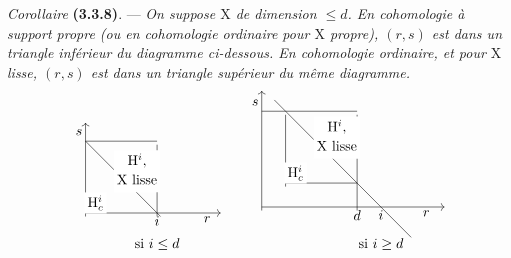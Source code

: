 \documentclass[11pt,leqno]{article}
\begin{document}
\textit{Corollaire} \textbf{(3.3.8)}. — \textit{On suppose \(\mathrm{X}\) de dimension \(\leq d\). En cohomologie à support propre (ou en cohomologie ordinaire pour \(\mathrm{X}\) propre), \((r,s)\) est dans un triangle inférieur du diagramme ci-dessous. En cohomologie ordinaire, et pour \(\mathrm{X}\) lisse, \((r,s)\) est dans un triangle supérieur du même diagramme.}
\[
\begin{tikzcd}[
  ampersand replacement=\&,
  baseline=(current bounding box.south),
  row sep=0pt,
  column sep=0pt,
  cells={nodes={inner sep=0pt,outer sep=0pt,minimum size=0pt,text height=0pt,text depth=0pt}},
  arrows={shorten <=0pt,shorten >=0pt}
]
{} \&[1.8cm] {} \&[1.6cm] {}
\\[0.55cm]
{} \arrow[r,no head] \arrow[dr,no head]
\& {} \arrow[d,no head]
\& {}
\\[1.8cm]
{} \arrow[uu,"\textstyle s"{pos=.9,left}]
   \arrow[rr,"\textstyle r"{pos=.9,below}]
   \arrow[r,phantom,"\textstyle i"{pos=1,below}]
   \arrow[r,phantom,"\textstyle\text{si }i\leq d"{pos=1,below,yshift=-.55cm}]
   \arrow[ur,phantom,"\textstyle\mathrm{H}_c^i"{description,pos=.18}]
   \arrow[ur,phantom,"{\begin{gathered}\textstyle\mathrm{H}^i,\\[-.3ex]\textstyle\mathrm{X}\ \text{lisse}\end{gathered}}"{description,pos=.6,xshift=.25cm}]
\& {}
\& {}
\end{tikzcd}
\qquad
\begin{tikzcd}[
  ampersand replacement=\&,
  baseline=(current bounding box.south),
  row sep=0pt,
  column sep=0pt,
  cells={nodes={inner sep=0pt,outer sep=0pt,minimum size=0pt,text height=0pt,text depth=0pt}},
  arrows={shorten <=0pt,shorten >=0pt}
]
{} \&[.6cm] {} \&[1.8cm] {} \&[.6cm] {} \&[1.6cm] {}
\\[.6cm]
{} \arrow[r,no head]
\& {} \arrow[r,no head]
      \arrow[dr,no head,shorten <=-4mm,shorten >=-18mm]
\& {} \arrow[d,no head]
\& {}
\& {}
\\[1.8cm]
{}
\& {} \arrow[u,no head] \arrow[r,no head]
      \arrow[ur,phantom,"\textstyle\mathrm{H}_c^i"{description,pos=.18}]
      \arrow[ur,phantom,"{\begin{gathered}\textstyle\mathrm{H}^i,\\[-.3ex]\textstyle\mathrm{X}\ \text{lisse}\end{gathered}}"{description,pos=.65,xshift=.15cm}]
\& {} \arrow[d,no head]
\& {}
\& {}
\\[.6cm]
{} \arrow[uuu,"\textstyle s"{pos=.9,left}]
   \arrow[rrrr,"\textstyle r"{pos=.9,below}]
   \arrow[rr,phantom,"\textstyle d"{pos=1,below}]
   \arrow[rrr,phantom,"\textstyle i"{pos=1,below}]
   \arrow[rrr,phantom,"\textstyle\text{si }i\geq d"{pos=1,below,yshift=-.7cm}]
\& {}
\& {}
\& {}
\& {}
\end{tikzcd}
\]
\end{document}
